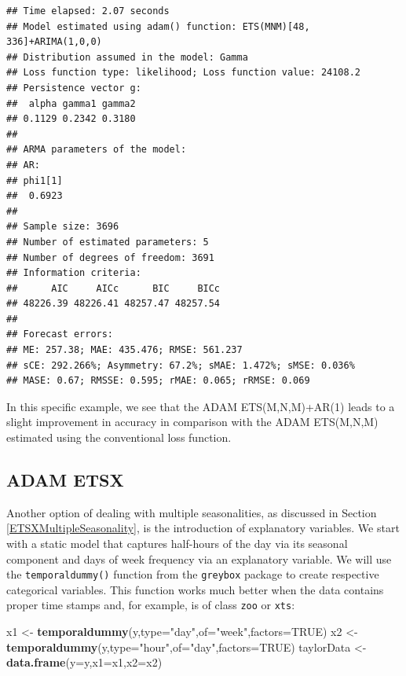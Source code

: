 \documentclass[]{book}
\newenvironment{Shaded}{\begin{snugshade}}{\end{snugshade}}
\newcommand{\DataTypeTok}[1]{\textcolor[rgb]{0.13,0.29,0.53}{#1}}
\newcommand{\KeywordTok}[1]{\textcolor[rgb]{0.13,0.29,0.53}{\textbf{#1}}}
\newcommand{\NormalTok}[1]{#1}
\newcommand{\OtherTok}[1]{\textcolor[rgb]{0.56,0.35,0.01}{#1}}
\newcommand{\StringTok}[1]{\textcolor[rgb]{0.31,0.60,0.02}{#1}}
\theoremstyle{definition}
\theoremstyle{definition}
\theoremstyle{definition}
\theoremstyle{definition}
\theoremstyle{remark}
\begin{document}
\begin{verbatim}
## Time elapsed: 2.07 seconds
## Model estimated using adam() function: ETS(MNM)[48, 336]+ARIMA(1,0,0)
## Distribution assumed in the model: Gamma
## Loss function type: likelihood; Loss function value: 24108.2
## Persistence vector g:
##  alpha gamma1 gamma2 
## 0.1129 0.2342 0.3180 
## 
## ARMA parameters of the model:
## AR:
## phi1[1] 
##  0.6923 
## 
## Sample size: 3696
## Number of estimated parameters: 5
## Number of degrees of freedom: 3691
## Information criteria:
##      AIC     AICc      BIC     BICc 
## 48226.39 48226.41 48257.47 48257.54 
## 
## Forecast errors:
## ME: 257.38; MAE: 435.476; RMSE: 561.237
## sCE: 292.266%; Asymmetry: 67.2%; sMAE: 1.472%; sMSE: 0.036%
## MASE: 0.67; RMSSE: 0.595; rMAE: 0.065; rRMSE: 0.069
\end{verbatim}

In this specific example, we see that the ADAM ETS(M,N,M)+AR(1) leads to a slight improvement in accuracy in comparison with the ADAM ETS(M,N,M) estimated using the conventional loss function.

\hypertarget{adam-etsx}{%
\subsection{ADAM ETSX}\label{adam-etsx}}

Another option of dealing with multiple seasonalities, as discussed in Section \ref{ETSXMultipleSeasonality}, is the introduction of explanatory variables. We start with a static model that captures half-hours of the day via its seasonal component and days of week frequency via an explanatory variable. We will use the \texttt{temporaldummy()} function from the \texttt{greybox} package to create respective categorical variables. This function works much better when the data contains proper time stamps and, for example, is of class \texttt{zoo} or \texttt{xts}:

\begin{Shaded}
\begin{Highlighting}[]
\NormalTok{x1 <-}\StringTok{ }\KeywordTok{temporaldummy}\NormalTok{(y,}\DataTypeTok{type=}\StringTok{"day"}\NormalTok{,}\DataTypeTok{of=}\StringTok{"week"}\NormalTok{,}\DataTypeTok{factors=}\OtherTok{TRUE}\NormalTok{)}
\NormalTok{x2 <-}\StringTok{ }\KeywordTok{temporaldummy}\NormalTok{(y,}\DataTypeTok{type=}\StringTok{"hour"}\NormalTok{,}\DataTypeTok{of=}\StringTok{"day"}\NormalTok{,}\DataTypeTok{factors=}\OtherTok{TRUE}\NormalTok{)}
\NormalTok{taylorData <-}\StringTok{ }\KeywordTok{data.frame}\NormalTok{(}\DataTypeTok{y=}\NormalTok{y,}\DataTypeTok{x1=}\NormalTok{x1,}\DataTypeTok{x2=}\NormalTok{x2)}
\end{Highlighting}
\end{Shaded}
\end{document}
